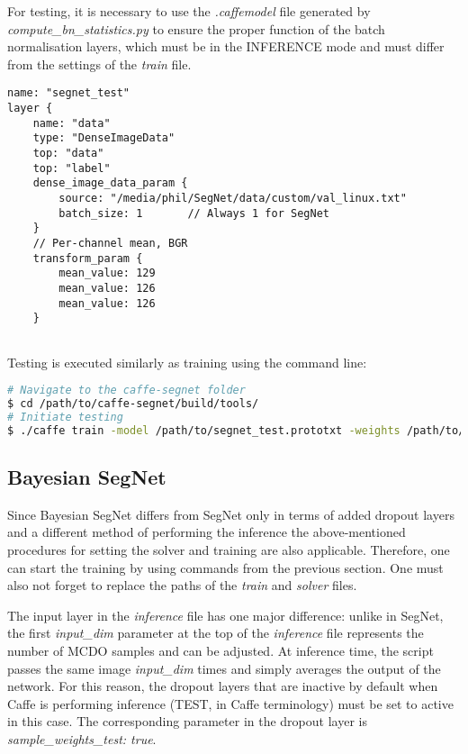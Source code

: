 For testing, it is necessary to use the \textit{.caffemodel} file generated by \textit{compute\_bn\_statistics.py} to ensure the proper function of the batch normalisation layers, which must be in the INFERENCE mode and must differ from the settings of the \textit{train} file.

\begin{lstlisting}[caption={Setting up the input layer of \textit{test.prototxt} \cite{filip_github}},captionpos=b]
name: "segnet_test"
layer {
	name: "data"
	type: "DenseImageData"
	top: "data"
	top: "label"
	dense_image_data_param {
		source: "/media/phil/SegNet/data/custom/val_linux.txt"	
		batch_size: 1		// Always 1 for SegNet
	}
	// Per-channel mean, BGR
	transform_param {
		mean_value: 129
		mean_value: 126
		mean_value: 126 
	}  
	
\end{lstlisting}

Testing is executed similarly as training using the command line:

\begin{lstlisting}[language=bash]
# Navigate to the caffe-segnet folder
$ cd /path/to/caffe-segnet/build/tools/
# Initiate testing
$ ./caffe train -model /path/to/segnet_test.prototxt -weights /path/to/final_weights.caffemodel
\end{lstlisting}

\newpage
\subsection{Bayesian SegNet}

Since Bayesian SegNet differs from SegNet only in terms of added dropout layers and a different method of performing the inference the above-mentioned procedures for setting the solver and training are also applicable. Therefore, one can start the training by using commands from the previous section. One must also not forget to replace the paths of the \textit{train} and \textit{solver} files. 

The input layer in the \textit{inference} file has one major difference: unlike in SegNet, the first \textit{input\_dim} parameter at the top of the \textit{inference} file represents the number of MCDO samples and can be adjusted. At inference time, the script passes the same image \textit{input\_dim} times and simply averages the output of the network. For this reason, the dropout layers that are inactive by default when Caffe is performing inference (TEST, in Caffe terminology) must be set to active in this case. The corresponding parameter in the dropout layer is \textit{sample\_weights\_test: true}. 

